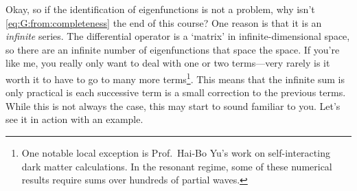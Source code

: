 Okay, so if the identification of eigenfunctions is not a problem, why isn't \eqref{eq:G:from:completeness} the end of this course? One reason is that it is an \emph{infinite} series. The differential operator is a `matrix' in  infinite-dimensional space, so there are an infinite number of eigenfunctions that space the space. If you're like me, you really only want to deal with one or two terms---very rarely is it worth it to have to go to many more terms\footnote{One notable local exception is Prof.~Hai-Bo Yu's work on self-interacting dark matter calculations. In the resonant regime, some of these numerical results require sums over hundreds of partial waves.}. This means that the infinite sum is only practical is each successive term is a small correction to the previous terms. While this is not always the case, this may start to sound familiar to you. Let's see it in action with an example.


